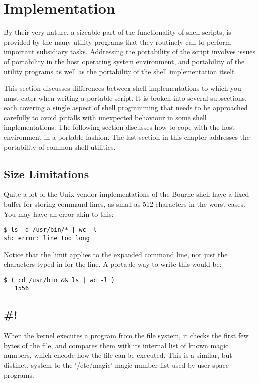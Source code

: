 \section{Implementation}

By their very nature, a sizeable part of the functionality of shell scripts, is provided by the many utility programs that they routinely call to perform important subsidiary tasks. Addressing the portability of the script involves issues of portability in the host operating system environment, and portability of the utility programs as well as the portability of the shell implementation itself.

This section discusses differences between shell implementations to which you must cater when writing a portable script. It is broken into several subsections, each covering a single aspect of shell programming that needs to be approached carefully to avoid pitfalls with unexpected behaviour in some shell implementations. The following section discusses how to cope with the host environment in a portable fashion. The last section in this chapter addresses the portability of common shell utilities. 

\subsection{Size Limitations}

Quite a lot of the Unix vendor implementations of the Bourne shell have a fixed buffer for storing command lines, as small as 512 characters in the worst cases. You may have an error akin to this:

 	
\begin{Verbatim}[frame=single]
$ ls -d /usr/bin/* | wc -l
sh: error: line too long
\end{Verbatim}

Notice that the limit applies to the expanded command line, not just the characters typed in for the line. A portable way to write this would be:

 	
\begin{Verbatim}[frame=single]
$ ( cd /usr/bin && ls | wc -l )
   1556
\end{Verbatim}


\subsection{\#!}

When the kernel executes a program from the file system, it checks the first few bytes of the file, and compares them with its internal list of known magic numbers, which encode how the file can be executed. This is a similar, but distinct, system to the `/etc/magic' magic number list used by user space programs.

